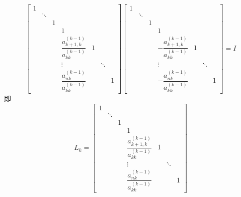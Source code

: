 \documentclass[UTF8,a4paper,10pt]{ctexart}
\begin{document}
                $$
                    \begin{bmatrix}
                        1 & \  & \  & \  & \  & \  & \  \\
                        \  & \ddots & \  & \  & \  & \  & \  \\
                        \  & \ & 1 & \  & \  & \  & \  \\
                        \  & \ & \  & 1 & \  & \  & \  \\
                        \  & \ & \  & \dfrac{a_{k+1,k}^{(k-1)}}{a_{kk}^{(k-1)}} & 1 & \  & \  \\
                        \  & \ & \  & \vdots & \  & \ddots & \  \\
                        \  & \ & \  & \dfrac{a_{nk}^{(k-1)}}{a_{kk}^{(k-1)}} & \  & \  & 1
                    \end{bmatrix}
                    \begin{bmatrix}
                        1 & \  & \  & \  & \  & \  & \  \\
                        \  & \ddots & \  & \  & \  & \  & \  \\
                        \  & \ & 1 & \  & \  & \  & \  \\
                        \  & \ & \  & 1 & \  & \  & \  \\
                        \  & \ & \  & -\dfrac{a_{k+1,k}^{(k-1)}}{a_{kk}^{(k-1)}} & 1 & \  & \  \\
                        \  & \ & \  & \vdots & \  & \ddots & \  \\
                        \  & \ & \  & -\dfrac{a_{nk}^{(k-1)}}{a_{kk}^{(k-1)}} & \  & \  & 1
                    \end{bmatrix}=I
                $$
                即
                $$
                L_k=
                    \begin{bmatrix}
                        1 & \  & \  & \  & \  & \  & \  \\
                        \  & \ddots & \  & \  & \  & \  & \  \\
                        \  & \ & 1 & \  & \  & \  & \  \\
                        \  & \ & \  & 1 & \  & \  & \  \\
                        \  & \ & \  & \dfrac{a_{k+1,k}^{(k-1)}}{a_{kk}^{(k-1)}} & 1 & \  & \  \\
                        \  & \ & \  & \vdots & \  & \ddots & \  \\
                        \  & \ & \  & \dfrac{a_{nk}^{(k-1)}}{a_{kk}^{(k-1)}} & \  & \  & 1
                    \end{bmatrix}
                $$
\end{document}

